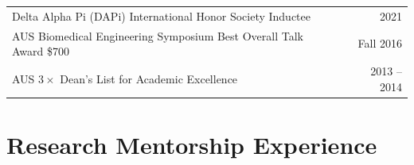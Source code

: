 \documentclass[letterpaper,11pt]{article}
\begin{document}
\begin{longtable}{@{}p{}r@{}}
  \hspace{3mm} Delta Alpha Pi (DAPi) International Honor Society Inductee                                                                                                                                                                                & 2021         \\ [4pt]
  \hspace{3mm} AUS Biomedical Engineering Symposium Best Overall Talk Award \$700                                                                                                                                                                        & Fall 2016    \\ [4pt]
  \hspace{3mm} AUS $3\times$ Dean's List for Academic Excellence                                                                                                                                                                                         & 2013 -- 2014 \\ [4pt]
\end{longtable}


\section*{Research Mentorship Experience}

\vspace{0.4em}

\newcommand{\mentee}[3]{%
  \noindent
  \begin{tabular*}{\textwidth}{@{\extracolsep{\fill}} l c r @{}}
    \textbf{#1} & \textit{#2} & \textit{#3} \\
  \end{tabular*}\par\vspace{-0.55em}%
}
\newenvironment{menteeitems}{%
	\begingroup
	\small
  \begin{itemize}
    \setlength{\itemsep}{0.15em}
    \setlength{\parskip}{0pt}
    \setlength{\topsep}{0.15em}
    \setlength{\leftmargin}{0em}
  }{%
  \end{itemize}
\endgroup
	\vspace{0.0em}
}

\end{document}
